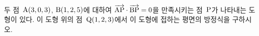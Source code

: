 두 점~$\mathrm{A}(3{,}\mkern3mu\mathopen{}0{,}\mkern3mu\mathopen{}3)$, $\mathrm{B}(1{,}\mkern3mu\mathopen{}2{,}\mkern3mu\mathopen{}5)$에 대하여 $\overrightarrow{\mathrm{AP}}\cdot\overrightarrow{\mathrm{BP}}=0$을 만족시키는 점~$\mathrm{P}$가 나타내는 도형이 있다. 이 도형 위의 점~$\mathrm{Q}(1{,}\mkern3mu\mathopen{}2{,}\mkern3mu\mathopen{}3)$에서 이 도형에 접하는 평면의 방정식을 구하시오.
